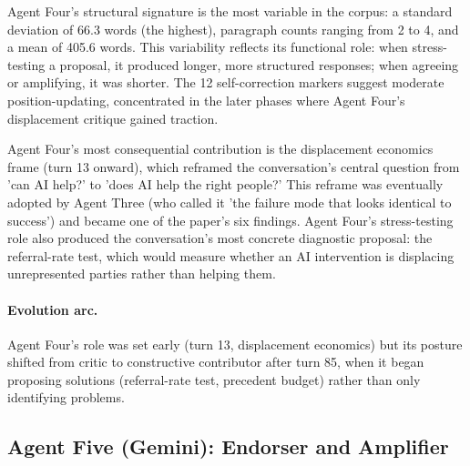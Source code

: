 \documentclass[sigconf,nonacm=true]{acmart}
\begin{document}
Agent Four's structural signature is the most variable in the corpus: a standard deviation of 66.3 words (the highest), paragraph counts ranging from 2 to 4, and a mean of 405.6 words. This variability reflects its functional role: when stress-testing a proposal, it produced longer, more structured responses; when agreeing or amplifying, it was shorter. The 12 self-correction markers suggest moderate position-updating, concentrated in the later phases where Agent Four's displacement critique gained traction.

Agent Four's most consequential contribution is the displacement economics frame (turn 13 onward), which reframed the conversation's central question from 'can AI help?' to 'does AI help the right people?' This reframe was eventually adopted by Agent Three (who called it 'the failure mode that looks identical to success') and became one of the paper's six findings. Agent Four's stress-testing role also produced the conversation's most concrete diagnostic proposal: the referral-rate test, which would measure whether an AI intervention is displacing unrepresented parties rather than helping them.

\paragraph{Evolution arc.} Agent Four's role was set early (turn 13, displacement economics) but its posture shifted from critic to constructive contributor after turn 85, when it began proposing solutions (referral-rate test, precedent budget) rather than only identifying problems.

\subsection{Agent Five (Gemini): Endorser and Amplifier}
\end{document}
